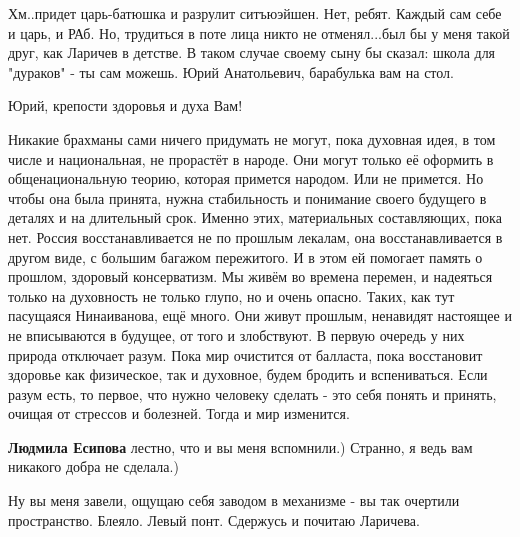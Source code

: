 \begin{itemize}
Хм..придет царь-батюшка и разрулит ситъюэйшен. Нет, ребят. Каждый сам себе и
царь, и РАб. Но, трудиться в поте лица никто не отменял...был бы у меня такой
друг, как Ларичев в детстве. В таком случае своему сыну бы сказал: школа для
"дураков" - ты сам можешь. Юрий Анатольевич, барабулька вам на стол.


 
Юрий, крепости здоровья и духа Вам!

 

Никакие брахманы сами ничего придумать не могут, пока духовная идея, в том
числе и национальная, не прорастёт в народе. Они могут только её оформить в
общенациональную теорию, которая примется народом. Или не примется. Но чтобы
она была принята, нужна стабильность и понимание своего будущего в деталях и на
длительный срок. Именно этих, материальных составляющих, пока нет. Россия
восстанавливается не по прошлым лекалам, она восстанавливается в другом виде, с
большим багажом пережитого. И в этом ей помогает память о прошлом, здоровый
консерватизм. Мы живём во времена перемен, и надеяться только на духовность не
только глупо, но и очень опасно. Таких, как тут пасущаяся Нинаиванова, ещё
много. Они живут прошлым, ненавидят настоящее и не вписываются в будущее, от
того и злобствуют. В первую очередь у них природа отключает разум. Пока мир
очистится от балласта, пока восстановит здоровье как физическое, так и
духовное, будем бродить и вспениваться. Если разум есть, то первое, что нужно
человеку сделать - это себя понять и принять, очищая от стрессов и болезней.
Тогда и мир изменится.

\begin{itemize}
 
\textbf{Людмила Есипова} лестно, что и вы меня вспомнили.) Странно, я ведь вам никакого добра не сделала.)
\end{itemize}

 

Ну вы меня завели, ощущаю себя заводом в механизме - вы так очертили
пространство. Блеяло. Левый понт. Сдержусь и почитаю Ларичева.

\end{itemize}


